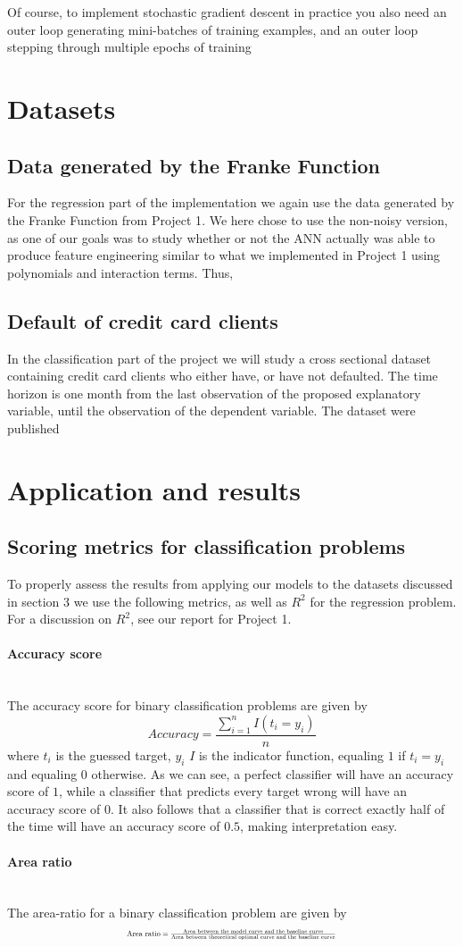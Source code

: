 \documentclass[10pt, a4paper, twocolumn]{article}
\newcommand{\myparagraph}[1]{\paragraph{#1}\mbox{}\\}
\begin{document}
			Of course, to implement stochastic gradient descent in practice you also need an outer loop generating mini-batches of training examples, and an outer loop stepping through multiple epochs of training

\section{Datasets}
	\subsection{Data generated by the Franke Function}
		For the regression part of the implementation we again use the data generated by the Franke Function from Project 1\cite{Project1}. We here chose to use the non-noisy version, as one of our goals was to study whether or not the ANN actually was able to produce feature engineering similar to what we implemented in Project 1 using polynomials and interaction terms. Thus,  
	\subsection{Default of credit card clients}
		In the classification part of the project we will study a cross sectional dataset containing credit card clients who either have, or have not defaulted. The time horizon is one month from the last observation of the proposed explanatory variable, until the observation of the dependent variable. The dataset were published 

\section{Application and results}
	\subsection{Scoring metrics for classification problems}
		To properly assess the results from applying our models to the datasets discussed in section 3 we use the following metrics, as well as $R^2$ for the regression problem. For a discussion on $R^2$, see our report for Project 1\cite{Project1}.
		\myparagraph{Accuracy score}
			The accuracy score for binary classification problems are given by
				$$Accuracy=\frac{\sum_{i=1}^nI(t_i=y_i)}{n}$$
			where $t_i$ is the guessed target, $y_i$ $I$ is the indicator function, equaling $1$ if $t_i=y_i$ and equaling $0$ otherwise.
			As we can see, a perfect classifier will have an accuracy score of $1$, while a classifier that predicts every target wrong will have an accuracy score of $0$. It also follows that a classifier that is correct exactly half of the time will have an accuracy score of $0.5$, making interpretation easy.
		\myparagraph{Area ratio}
			The area-ratio for a binary classification problem are given by
				\begin{equation*}
					\resizebox{.5 \textwidth}{!}
					{
					$\text{Area ratio} =\frac{\text{Area between the model curve and the baseline curve}}{\text{Area between theoretical optimal curve and the baseline curve}}$
					}
				\end{equation*}
\end{document}
